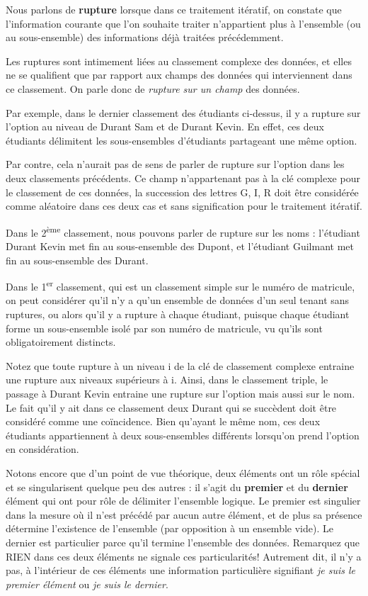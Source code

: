 Nous parlons de \textbf{rupture} lorsque dans ce traitement itératif, on
constate que l’information courante que l’on souhaite traiter
n’appartient plus à l’ensemble (ou au sous-ensemble) des informations
déjà traitées précédemment.

Les ruptures sont intimement liées au classement complexe des données,
et elles ne se qualifient que par rapport aux champs des données qui
interviennent dans ce classement. On parle donc de \textit{rupture sur
un champ} des données.

Par exemple, dans le dernier classement des étudiants ci-dessus, il y a
rupture sur l’option au niveau de Durant Sam et de Durant Kevin. En
effet, ces deux étudiants délimitent les sous-ensembles d’étudiants
partageant une même option.

Par contre, cela n’aurait pas de sens de parler de rupture sur l’option
dans les deux classements précédents. Ce champ n’appartenant pas à la
clé complexe pour le classement de ces données, la succession des
lettres G, I, R doit être considérée comme aléatoire dans ces deux cas
et sans signification pour le traitement itératif.

Dans le 2\textsuperscript{ème} classement, nous pouvons parler de
rupture sur les noms : l’étudiant Durant Kevin met fin au sous-ensemble
des Dupont, et l’étudiant Guilmant met fin au sous-ensemble des Durant.


Dans le 1\textsuperscript{er} classement, qui est un classement simple
sur le numéro de matricule, on peut considérer qu’il n’y a qu’un
ensemble de données d’un seul tenant sans ruptures, ou alors qu’il y a
rupture à chaque étudiant, puisque chaque étudiant forme un
sous-ensemble isolé par son numéro de matricule, vu qu’ils sont
obligatoirement distincts.

Notez que toute rupture à un niveau i de la clé de classement complexe
entraine une rupture aux niveaux supérieurs à i. Ainsi, dans le
classement triple, le passage à Durant Kevin entraine une rupture sur
l’option mais aussi sur le nom. Le fait qu’il y ait dans ce classement
deux Durant qui se succèdent doit être considéré comme une coïncidence.
Bien qu’ayant le même nom, ces deux étudiants appartiennent à deux
sous-ensembles différents lorsqu’on prend l’option en considération.

Notons encore que d’un point de vue théorique, deux éléments ont un rôle
spécial et se singularisent quelque peu des autres : il s’agit du
\textbf{premier} et du \textbf{dernier} élément qui ont pour rôle de
délimiter l’ensemble logique. Le premier est singulier dans la mesure
où il n’est précédé par aucun autre élément, et de plus sa présence
détermine l’existence de l’ensemble (par opposition à un ensemble
vide). Le dernier est particulier parce qu’il termine l’ensemble des
données. Remarquez que RIEN dans ces deux éléments ne signale ces
particularités! Autrement dit, il n’y a pas, à l’intérieur de ces
éléments une information particulière signifiant \textit{je suis le
premier élément} ou \textit{je suis le dernier}.


